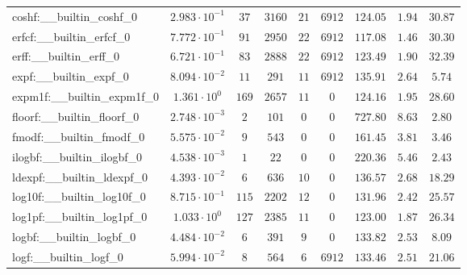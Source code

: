 \begin{tabular}{|l|c|c|c|c|c|c|c|c|}
coshf:\_\_builtin\_coshf\_0               & $ 2.983 \cdot 10^{-1} $ & $ 37     $ & $ 3160  $ & $ 21  $ & $ 6912   $ & $ 124.05      $ & $ 1.94    $ & $ 30.87   $ \\
erfcf:\_\_builtin\_erfcf\_0               & $ 7.772 \cdot 10^{-1} $ & $ 91     $ & $ 2950  $ & $ 22  $ & $ 6912   $ & $ 117.08      $ & $ 1.46    $ & $ 30.30   $ \\
erff:\_\_builtin\_erff\_0                 & $ 6.721 \cdot 10^{-1} $ & $ 83     $ & $ 2888  $ & $ 22  $ & $ 6912   $ & $ 123.49      $ & $ 1.90    $ & $ 32.39   $ \\
expf:\_\_builtin\_expf\_0                 & $ 8.094 \cdot 10^{-2} $ & $ 11     $ & $ 291   $ & $ 11  $ & $ 6912   $ & $ 135.91      $ & $ 2.64    $ & $ 5.74    $ \\
expm1f:\_\_builtin\_expm1f\_0             & $ 1.361 \cdot 10^{0}  $ & $ 169    $ & $ 2657  $ & $ 11  $ & $ 0      $ & $ 124.16      $ & $ 1.95    $ & $ 28.60   $ \\
floorf:\_\_builtin\_floorf\_0             & $ 2.748 \cdot 10^{-3} $ & $ 2      $ & $ 101   $ & $ 0   $ & $ 0      $ & $ 727.80      $ & $ 8.63    $ & $ 2.80    $ \\
fmodf:\_\_builtin\_fmodf\_0               & $ 5.575 \cdot 10^{-2} $ & $ 9      $ & $ 543   $ & $ 0   $ & $ 0      $ & $ 161.45      $ & $ 3.81    $ & $ 3.46    $ \\
ilogbf:\_\_builtin\_ilogbf\_0             & $ 4.538 \cdot 10^{-3} $ & $ 1      $ & $ 22    $ & $ 0   $ & $ 0      $ & $ 220.36      $ & $ 5.46    $ & $ 2.43    $ \\
ldexpf:\_\_builtin\_ldexpf\_0             & $ 4.393 \cdot 10^{-2} $ & $ 6      $ & $ 636   $ & $ 10  $ & $ 0      $ & $ 136.57      $ & $ 2.68    $ & $ 18.29   $ \\
log10f:\_\_builtin\_log10f\_0             & $ 8.715 \cdot 10^{-1} $ & $ 115    $ & $ 2202  $ & $ 12  $ & $ 0      $ & $ 131.96      $ & $ 2.42    $ & $ 25.57   $ \\
log1pf:\_\_builtin\_log1pf\_0             & $ 1.033 \cdot 10^{0}  $ & $ 127    $ & $ 2385  $ & $ 11  $ & $ 0      $ & $ 123.00      $ & $ 1.87    $ & $ 26.34   $ \\
logbf:\_\_builtin\_logbf\_0               & $ 4.484 \cdot 10^{-2} $ & $ 6      $ & $ 391   $ & $ 9   $ & $ 0      $ & $ 133.82      $ & $ 2.53    $ & $ 8.09    $ \\
logf:\_\_builtin\_logf\_0                 & $ 5.994 \cdot 10^{-2} $ & $ 8      $ & $ 564   $ & $ 6   $ & $ 6912   $ & $ 133.46      $ & $ 2.51    $ & $ 21.06   $ \\

\end{tabular}
